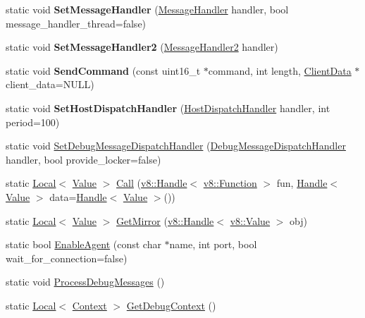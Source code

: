\begin{DoxyCompactItemize}
\item 
\hypertarget{classv8_1_1_debug_ab079dd46bc3989eb990c7ef40604c5a2}{}static void {\bfseries Set\+Message\+Handler} (\hyperlink{classv8_1_1_debug_aea5c8ab838a3b3c263a71828fb0767ac}{Message\+Handler} handler, bool message\+\_\+handler\+\_\+thread=false)\label{classv8_1_1_debug_ab079dd46bc3989eb990c7ef40604c5a2}

\item 
\hypertarget{classv8_1_1_debug_a0375563b2a1e0b4ea5f70a742209bb3f}{}static void {\bfseries Set\+Message\+Handler2} (\hyperlink{classv8_1_1_debug_a0fb8f7e1f8fa47cb23f7ad72cd533c77}{Message\+Handler2} handler)\label{classv8_1_1_debug_a0375563b2a1e0b4ea5f70a742209bb3f}

\item 
\hypertarget{classv8_1_1_debug_a2b221598c358e7e72d7801a74a69fb14}{}static void {\bfseries Send\+Command} (const uint16\+\_\+t $\ast$command, int length, \hyperlink{classv8_1_1_debug_1_1_client_data}{Client\+Data} $\ast$client\+\_\+data=N\+U\+L\+L)\label{classv8_1_1_debug_a2b221598c358e7e72d7801a74a69fb14}

\item 
\hypertarget{classv8_1_1_debug_aa55c29d5cc7b04c4fc24cd89c77f3f54}{}static void {\bfseries Set\+Host\+Dispatch\+Handler} (\hyperlink{classv8_1_1_debug_a442f686afe7d80928b57b3ff8ac3f6e7}{Host\+Dispatch\+Handler} handler, int period=100)\label{classv8_1_1_debug_aa55c29d5cc7b04c4fc24cd89c77f3f54}

\item 
static void \hyperlink{classv8_1_1_debug_a5147f6cfeb9b87a67630b8c959996e9c}{Set\+Debug\+Message\+Dispatch\+Handler} (\hyperlink{classv8_1_1_debug_a91cd8aa9743e3478bc63fe73abcd557c}{Debug\+Message\+Dispatch\+Handler} handler, bool provide\+\_\+locker=false)
\item 
static \hyperlink{classv8_1_1_local}{Local}$<$ \hyperlink{classv8_1_1_value}{Value} $>$ \hyperlink{classv8_1_1_debug_a49a3e0cf585cfd201d8ab1bc395d0593}{Call} (\hyperlink{classv8_1_1_handle}{v8\+::\+Handle}$<$ \hyperlink{classv8_1_1_function}{v8\+::\+Function} $>$ fun, \hyperlink{classv8_1_1_handle}{Handle}$<$ \hyperlink{classv8_1_1_value}{Value} $>$ data=\hyperlink{classv8_1_1_handle}{Handle}$<$ \hyperlink{classv8_1_1_value}{Value} $>$())
\item 
static \hyperlink{classv8_1_1_local}{Local}$<$ \hyperlink{classv8_1_1_value}{Value} $>$ \hyperlink{classv8_1_1_debug_aa7d07c7d5c9ee2eaaa9af310bcbf58f5}{Get\+Mirror} (\hyperlink{classv8_1_1_handle}{v8\+::\+Handle}$<$ \hyperlink{classv8_1_1_value}{v8\+::\+Value} $>$ obj)
\item 
static bool \hyperlink{classv8_1_1_debug_a78506e80b599010624c5fcde72a643a7}{Enable\+Agent} (const char $\ast$name, int port, bool wait\+\_\+for\+\_\+connection=false)
\item 
static void \hyperlink{classv8_1_1_debug_a888e06766caee0380c6aa010b00e1a54}{Process\+Debug\+Messages} ()
\item 
static \hyperlink{classv8_1_1_local}{Local}$<$ \hyperlink{classv8_1_1_context}{Context} $>$ \hyperlink{classv8_1_1_debug_a2343a321b0db41324b7e8a7402f57cf0}{Get\+Debug\+Context} ()
\end{DoxyCompactItemize}


